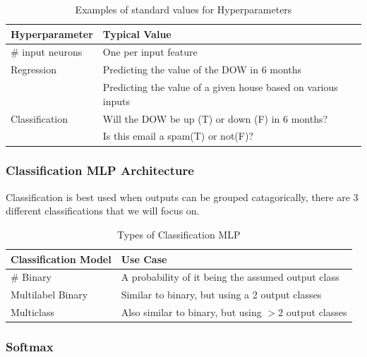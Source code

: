 \documentclass[article]{llncs}
\begin{document}
\begin{table}[!htbp]
\caption{Examples of standard values for Hyperparameters}\label{tab1}
\begin{tabular}{|l|l|}
\hline
Hyperparameter &  Typical Value \\
\hline
$\#$ input neurons &  One per input feature\\
\hline
Regression &  {Predicting the value of the DOW in 6 months} \\
           & {Predicting the value of a given house based on various inputs}\\
\hline
Classification & {Will the DOW be up (T) or down (F) in 6 months?}\\
               & {Is this email a spam(T) or not(F)?} \\
\hline
\end{tabular}
\end{table}

\subsubsection{Classification MLP Architecture}
Classification is best used when outputs can be grouped catagorically, there are 3 different classifications that we will focus on.

\begin{table}[H]
\caption{Types of Classification MLP}\label{tab1}
\begin{tabular}{|l|l|}
\hline
Classification Model &  Use Case \\
\hline
$\#$ Binary &  A probability of it being the assumed output class\\
\hline
Multilabel Binary &  {Similar to binary, but using a 2 output classes} \\
\hline
Multiclass & {Also similar to binary, but using $>2$ output classes}\\
\hline
\end{tabular}
\end{table}
\subsubsection{Softmax}
\end{document}
